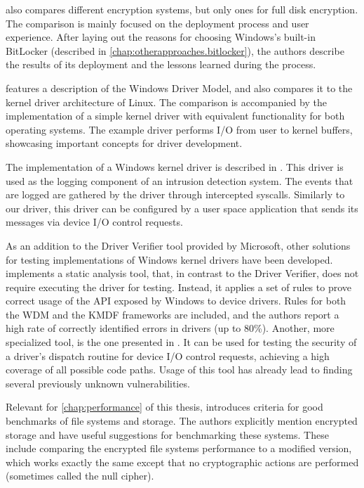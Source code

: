 \cite{Lewis2018} also compares different encryption systems, but only ones for full disk encryption. The comparison is mainly focused on the deployment process and user experience. After laying out the reasons for choosing Windows's built-in BitLocker (described in \autoref{chap:otherapproaches.bitlocker}), the authors describe the results of its deployment and the lessons learned during the process.

\cite{Tsegaye2004} features a description of the Windows Driver Model, and also compares it to the kernel driver architecture of Linux. The comparison is accompanied by the implementation of a simple kernel driver with equivalent functionality for both operating systems. The example driver performs I/O from user to kernel buffers, showcasing important concepts for driver development.

The implementation of a Windows kernel driver is described in \cite{Battistoni2008}. This driver is used as the logging component of an intrusion detection system. The events that are logged are gathered by the driver through intercepted syscalls. Similarly to our driver, this driver can be configured by a user space application that sends its messages via device I/O control requests.

As an addition to the Driver Verifier tool provided by Microsoft, other solutions for testing implementations of Windows kernel drivers have been developed. \cite{Ball2006} implements a static analysis tool, that, in contrast to the Driver Verifier, does not require executing the driver for testing. Instead, it applies a set of rules to prove correct usage of the API exposed by Windows to device drivers. Rules for both the WDM and the KMDF frameworks are included, and the authors report a high rate of correctly identified errors in drivers (up to 80\%). Another, more specialized tool, is the one presented in \cite{Ni2012}. It can be used for testing the security of a driver's dispatch routine for device I/O control requests, achieving a high coverage of all possible code paths. Usage of this tool has already lead to finding several previously unknown vulnerabilities.

Relevant for \autoref{chap:performance} of this thesis, \cite{Traeger2008} introduces criteria for good benchmarks of file systems and storage. The authors explicitly mention encrypted storage and have useful suggestions for benchmarking these systems. These include comparing the encrypted file systems performance to a modified version, which works exactly the same except that no cryptographic actions are performed (sometimes called the null cipher).

